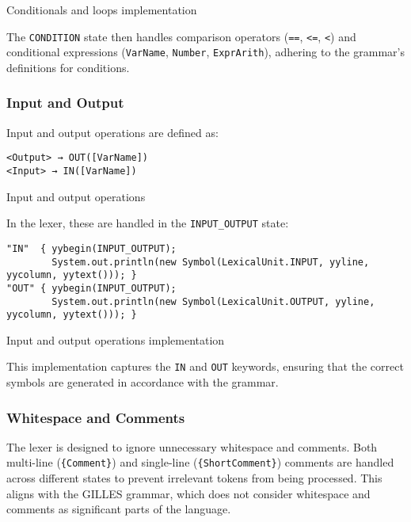     \begin{table}[h]
		\centering
		\caption{Conditionals and loops implementation}
	\end{table}

	The \texttt{CONDITION} state then handles comparison operators (\texttt{==}, \texttt{<=}, \texttt{<}) and conditional expressions (\texttt{VarName}, \texttt{Number}, \texttt{ExprArith}), adhering to the grammar's definitions for conditions.

	\subsubsection{Input and Output}
	Input and output operations are defined as:

	\begin{verbatim}
<Output> → OUT([VarName])
<Input> → IN([VarName])
	\end{verbatim}

     \begin{table}[h]
		\centering
		\caption{Input and output operations}
	\end{table}

	In the lexer, these are handled in the \texttt{INPUT\_OUTPUT} state:

	\begin{verbatim}
"IN"  { yybegin(INPUT_OUTPUT);
        System.out.println(new Symbol(LexicalUnit.INPUT, yyline, yycolumn, yytext())); }
"OUT" { yybegin(INPUT_OUTPUT);
        System.out.println(new Symbol(LexicalUnit.OUTPUT, yyline, yycolumn, yytext())); }
	\end{verbatim}

    \begin{table}[h]
		\centering
		\caption{Input and output operations implementation}
	\end{table}

	This implementation captures the \texttt{IN} and \texttt{OUT} keywords, ensuring that the correct symbols are generated in accordance with the grammar.


	\subsubsection{Whitespace and Comments}
	The lexer is designed to ignore unnecessary whitespace and comments. Both multi-line (\texttt{\{Comment\}}) and single-line (\texttt{\{ShortComment\}}) comments are handled across different states to prevent irrelevant tokens from being processed. This aligns with the GILLES grammar, which does not consider whitespace and comments as significant parts of the language.

